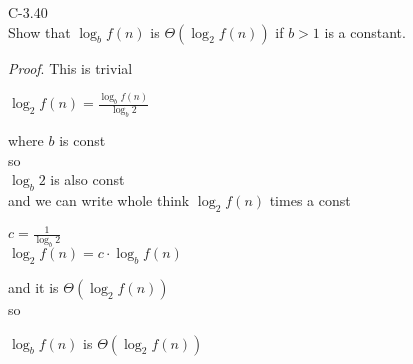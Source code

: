 \documentclass{article}
\begin{document}
	C-3.40\\
	Show that $\log_{b}{f(n)}$ is $ \Theta (\log_{2}f(n)) $ if $b > 1$ is a constant.\\
	\begin{flushleft}
		\textit{Proof}. This is trivial
	\end{flushleft}
	\begin{center}
		$\log_{2}f(n) = \frac{\log_{b}f(n)}{\log_{b}2}$\\
	\end{center}
	

	\begin{flushleft}
		where $b$ is const\\
		so \\
		$\log_{b}2$ is also const\\
		and we can write whole think	$\log_{2}f(n)$ times a const
	\end{flushleft}
	\begin{center}
		$c = \frac{1}{\log_{b}2}$\\
		$\log_{2}f(n) = c \cdot \log_{b}f(n)$ 
	\end{center}
	\begin{flushleft}
		and it is $ \Theta (\log_{2}f(n)) $\\
		so
	\end{flushleft}
	 \begin{center}
	 	$\log_{b}{f(n)}$ is $ \Theta (\log_{2}f(n)) $\\
	 \end{center}
	

	
\end{document}
